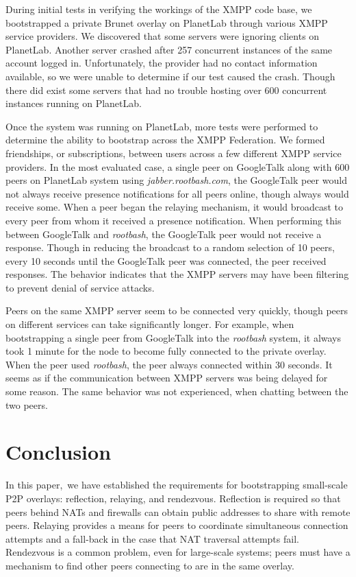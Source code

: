 \documentclass[conference]{IEEEtran}
\begin{document}
During initial tests in verifying the workings of the XMPP code base, we
bootstrapped a  private Brunet overlay on PlanetLab through various XMPP
service providers.  We discovered that some servers were ignoring clients on
PlanetLab.  Another server crashed after 257 concurrent instances of the same
account logged in.  Unfortunately, the provider had no contact information
available, so we were unable to determine if our test caused the crash.  Though
there did exist some servers that had no trouble hosting over 600 concurrent
instances running on PlanetLab.

Once the system was running on PlanetLab, more tests were performed to
determine the ability to bootstrap across the XMPP Federation.  We formed
friendships, or subscriptions, between users across a few different XMPP
service providers.  In the most evaluated case, a single peer on GoogleTalk
along with 600 peers on PlanetLab system using \textit{jabber.rootbash.com},
the GoogleTalk peer would not always receive presence notifications for all
peers online, though always would receive some.  When a peer began the relaying
mechanism, it would broadcast to every peer from whom it received a presence
notification.  When performing this between GoogleTalk and \textit{rootbash},
the GoogleTalk peer would not receive a response.  Though in reducing the
broadcast to a random selection of 10 peers, every 10 seconds until the
GoogleTalk peer was connected, the peer received responses.  The behavior
indicates that the XMPP servers may have been filtering to prevent denial of
service attacks.

Peers on the same XMPP server seem to be connected very quickly, though peers
on different services can take significantly longer.  For example, when
bootstrapping a single peer from GoogleTalk into the \textit{rootbash} system,
it always took 1 minute for the node to become fully connected to the private
overlay.  When the peer used \textit{rootbash}, the peer always connected
within 30 seconds.  It seems as if the communication between XMPP servers was
being delayed for some reason.  The same behavior was not experienced, when
chatting between the two peers.

\section{Conclusion}
\label{conclusions}

In this paper, we have established the requirements for bootstrapping
small-scale P2P overlays: reflection, relaying, and rendezvous.  Reflection is
required so that peers behind NATs and firewalls can obtain public addresses to
share with remote peers.  Relaying provides a means for peers to coordinate
simultaneous connection attempts and a fall-back in the case that NAT traversal
attempts fail.  Rendezvous is a common problem, even for large-scale systems;
peers must have a mechanism to find other peers connecting to are in the same
overlay.  
\end{document}
